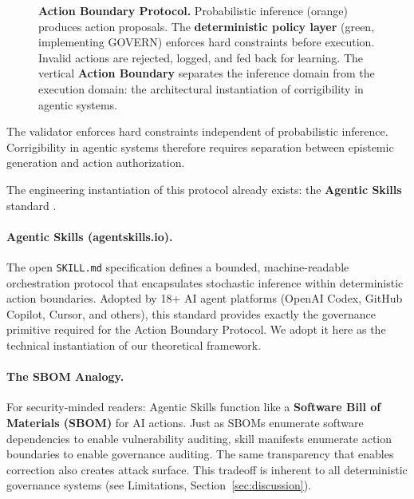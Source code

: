 \documentclass[11pt,a4paper]{article}
\theoremstyle{definition}
\begin{document}
\begin{figure}[htbp]
\caption{\textbf{Action Boundary Protocol.} Probabilistic inference (orange) produces action proposals. The \textbf{deterministic policy layer} (green, implementing GOVERN) enforces hard constraints before execution. Invalid actions are rejected, logged, and fed back for learning. The vertical \textbf{Action Boundary} separates the inference domain from the execution domain: the architectural instantiation of corrigibility in agentic systems.}
\label{fig:action-boundary}
\end{figure}

The validator enforces hard constraints independent of probabilistic inference. Corrigibility in agentic systems therefore requires separation between epistemic generation and action authorization.

The engineering instantiation of this protocol already exists: the \textbf{Agentic Skills} standard \citep{agentskills2025}.

\paragraph{Agentic Skills (agentskills.io).} The open \texttt{SKILL.md} specification defines a bounded, machine-readable orchestration protocol that encapsulates stochastic inference within deterministic action boundaries. Adopted by 18+ AI agent platforms (OpenAI Codex, GitHub Copilot, Cursor, and others), this standard provides exactly the governance primitive required for the Action Boundary Protocol. We adopt it here as the technical instantiation of our theoretical framework.

\paragraph{The SBOM Analogy.} For security-minded readers: Agentic Skills function like a \textbf{Software Bill of Materials (SBOM)} for AI actions. Just as SBOMs enumerate software dependencies to enable vulnerability auditing, skill manifests enumerate action boundaries to enable governance auditing. The same transparency that enables correction also creates attack surface. This tradeoff is inherent to all deterministic governance systems (see Limitations, Section~\ref{sec:discussion}).
\end{document}
